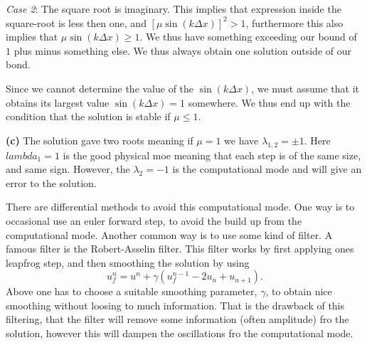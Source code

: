 \textit{Case 2}: The square root is imaginary. This implies that expression inside the square-root is less then one, and $\left[\mu\sin(k\Delta x)\right]^2>1$, furthermore this also implies that $\mu\sin(k\Delta x)\geq1$. We thus have something exceeding our bound of $1$ plus minus something else. We thus always obtain one solution outside of our bond.

\begin{answer}
    Since we cannot determine the value of the $\sin(k\Delta x)$, we must assume that it obtains its largest value $\sin(k\Delta x)=1$ somewhere. We thus end up with the condition that the solution is stable if $\mu\leq1$. 
\end{answer}


\textbf{(c)} The solution gave two roots meaning if $\mu=1$ we have $\lambda_{1,2}=\pm1$. Here $lambda_{1}=1$ is the good physical moe meaning that each step is of the same size, and same sign. However, the $\lambda_{2}=-1$ is the computational mode and will give an error to the solution. 

There are differential methods to avoid this computational mode. One way is to occasional use an euler forward step, to avoid the build up from the computational mode. Another common way is to use some kind of filter. A famous filter is the Robert-Asselin filter. This filter works by first applying ones leapfrog step, and then smoothing the solution by using 
\begin{equation}
    u_f^n = u^n + \gamma \left(u_f^{n-1}-2u_{n}+u_{n+1}\right). 
\end{equation}
Above one has to choose a suitable smoothing parameter, $\gamma$, to obtain nice smoothing without loosing to much information. That is the drawback of this filtering, that the filter will remove some information (often amplitude) fro the solution, however this will dampen the oscillations fro the computational mode.  